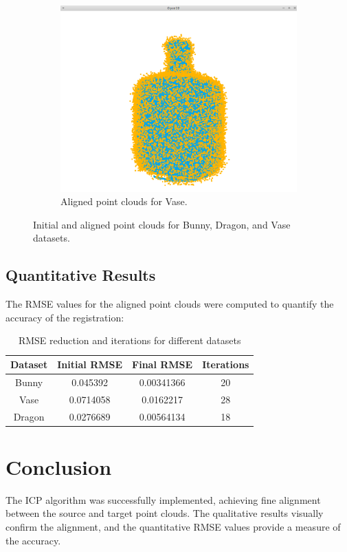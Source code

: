 \documentclass{article}
\begin{document}
\begin{figure}[h!]
\begin{subfigure}[b]{0.3\textwidth}
        \includegraphics[width=\textwidth]{vase2.png}
        \caption{Aligned point clouds for Vase.}
    \end{subfigure}

    \caption{Initial and aligned point clouds for Bunny, Dragon, and Vase datasets.}
    \label{fig:point_clouds}
\end{figure}


\subsection{Quantitative Results}
The RMSE values for the aligned point clouds were computed to quantify the accuracy of the registration:

\begin{table}[h!]
    \centering
    \begin{tabular}{|c|c|c|c|}
        \hline
        \textbf{Dataset} & \textbf{Initial RMSE} & \textbf{Final RMSE} & \textbf{Iterations} \\
        \hline
        Bunny & 0.045392 & 0.00341366 & 20 \\
        \hline
        Vase & 0.0714058 & 0.0162217 & 28 \\
        \hline
        Dragon & 0.0276689 & 0.00564134 & 18 \\
        \hline
    \end{tabular}
    \caption{RMSE reduction and iterations for different datasets}
    \label{tab:rmse_iterations}
\end{table}


\section{Conclusion}
The ICP algorithm was successfully implemented, achieving fine alignment between the source and target point clouds. The qualitative results visually confirm the alignment, and the quantitative RMSE values provide a measure of the accuracy.
\end{document}
